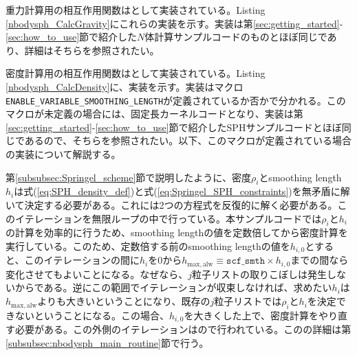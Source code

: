 \label{subsubsec:NbodySPH_interaction_functions}
重力計算用の相互作用関数はとして実装されている。Listing \ref{nbodysph_CalcGravity}にこれらの実装を示す。実装は第\ref{sec:getting_started}-\ref{sec:how_to_use}節で紹介した$N$体計算サンプルコードのものとほぼ同じであり、詳細はそちらを参照されたい。

\ifCpp %

\endifCpp
\ifFtn %

\endifFtn
\ifC %

\endifC

密度計算用の相互作用関数はとして実装されている。Listing \ref{nbodysph_CalcDensity}に、実装を示す。実装はマクロ\texttt{ENABLE\_VARIABLE\_SMOOTHING\_LENGTH}が定義されているか否かで分かれる。このマクロが未定義の場合には、固定長カーネルコードとなり、実装は第\ref{sec:getting_started}-\ref{sec:how_to_use}節で紹介したSPHサンプルコードとほぼ同じであるので、そちらを参照されたい。以下、このマクロが定義されている場合の実装について解説する。

第\ref{subsubsec:Springel_scheme}節で説明したように、密度$\rho_{i}$とsmoothing length $h_{i}$は式(\ref{eq:SPH_density_def})と式(\ref{eq:Springel_SPH_constraints})を無矛盾に解いて決定する必要がある。これには2つの方程式を反復的に解く必要がある。このイテレーションを無限ループの中で行っている。本サンプルコードでは$\rho_{i}$と$h_{i}$の計算を効率的に行うため、smoothing lengthの値を定数倍してから密度計算を実行している。このため、定数倍する前のsmoothing lengthの値を$h_{i,0}$とすると、このイテレーションの間に$h_{i}$を$0$から$h_{\mathrm{max,alw}}\equiv \mathtt{scf\_smth}\times h_{i,0}$までの間なら変化させてもよいことになる。なぜなら、$j$粒子リストの取りこぼしは発生しないからである。逆にこの範囲でイテレーションが収束しなければ、求めたい$h_{i}$は$h_{\mathrm{max,alw}}$よりも大きいということになり、既存の$j$粒子リストでは$\rho_{i}$と$h_{i}$を決定できないということになる。この場合、$h_{i,0}$を大きくした上で、密度計算をやり直す必要がある。この外側のイテレーションは\fileNameOfMainFunc ので行われている。この\procedure の詳細は第\ref{subsubsec:nbodysph_main_routine}節で行う。

